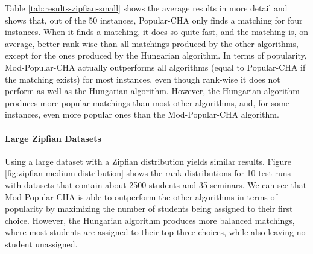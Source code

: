 \begin{table}[h!]
  \centering
  \caption{Average Results for the Small Zipfian Dataset with 50 Runs}
  \label{tab:results-zipfian-small}
\end{table}

Table \ref{tab:results-zipfian-small} shows the average results in more detail and shows that, out of the 50 instances, Popular-CHA only finds a matching for four instances. When it finds a matching, it does so quite fast, and the matching is, on average, better rank-wise than all matchings produced by the other algorithms, except for the ones produced by the Hungarian algorithm. In terms of popularity, Mod-Popular-CHA actually outperforms all algorithms (equal to Popular-CHA if the matching exists) for most instances, even though rank-wise it does not perform as well as the Hungarian algorithm. However, the Hungarian algorithm produces more popular matchings than most other algorithms, and, for some instances, even more popular ones than the Mod-Popular-CHA algorithm.

\paragraph{Large Zipfian Datasets}
Using a large dataset with a Zipfian distribution yields similar results. Figure \ref{fig:zipfian-medium-distribution} shows the rank distributions for 10 test runs with datasets that contain about 2500 students and 35 seminars. We can see that Mod Popular-CHA is able to outperform the other algorithms in terms of popularity by maximizing the number of students being assigned to their first choice. However, the Hungarian algorithm produces more balanced matchings, where most students are assigned to their top three choices, while also leaving no student unassigned.

